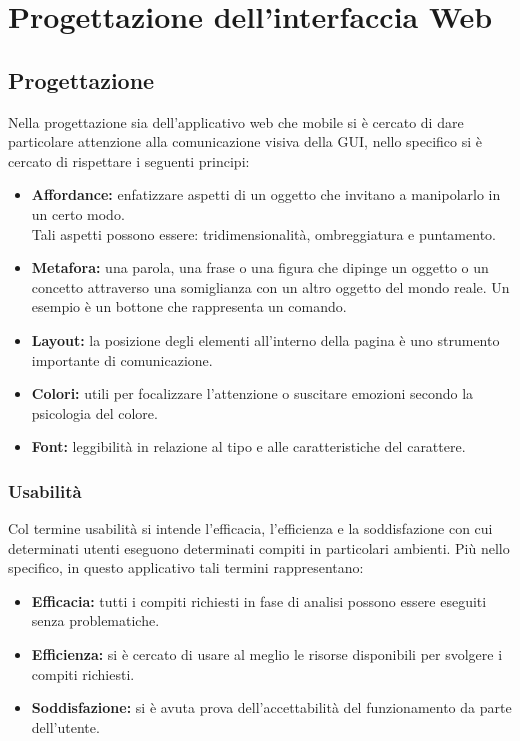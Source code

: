 \documentclass[a4paper,final,12pt]{report}
\begin{document}
\chapter{Progettazione dell'interfaccia Web}

\section{Progettazione}
Nella progettazione sia dell'applicativo web che mobile si è cercato di dare particolare attenzione alla comunicazione visiva della GUI, nello specifico si è cercato di rispettare i seguenti principi:
\begin{itemize}
\item \textbf{Affordance:} enfatizzare aspetti di un oggetto che invitano a manipolarlo in un certo modo.\\ Tali aspetti possono essere: tridimensionalità, ombreggiatura e puntamento.
\item \textbf{Metafora:} una parola, una frase o una figura che dipinge un oggetto o un concetto attraverso una somiglianza con un altro oggetto del mondo reale. Un esempio è un bottone che rappresenta un comando.
\item \textbf{Layout:} 
la posizione degli elementi all'interno della pagina è uno strumento importante di comunicazione.
\item \textbf{Colori:} utili per focalizzare l'attenzione o suscitare emozioni secondo la psicologia del colore.
\item \textbf{Font:} leggibilità in relazione al tipo e alle caratteristiche del carattere.
\end{itemize}

\subsection{Usabilità}
Col termine usabilità si intende l'efficacia, l'efficienza e la soddisfazione con cui determinati utenti eseguono determinati compiti in particolari ambienti. 
Più nello specifico, in questo applicativo tali termini rappresentano:
\begin{itemize}
\item \textbf{Efficacia:} tutti i compiti richiesti in fase di analisi possono essere eseguiti senza problematiche.
\item \textbf{Efficienza:} si è cercato di usare al meglio le risorse disponibili per svolgere i compiti richiesti.
\item \textbf{Soddisfazione:} si è avuta prova dell'accettabilità del funzionamento da parte dell'utente.
\end{itemize}
\end{document}
